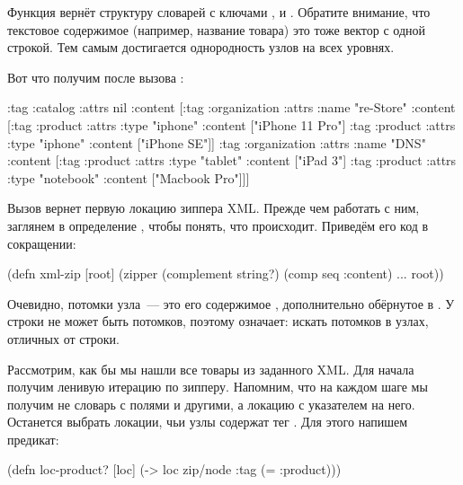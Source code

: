 Функция  вернёт структуру словарей с ключами ,
 и . Обратите внимание, что текстовое содержимое
(например, название товара) это тоже вектор с одной строкой. Тем самым
достигается однородность узлов на всех уровнях.

Вот что получим после вызова :

\begin{english}
  \begin{clojure}
{:tag :catalog
 :attrs nil
 :content
 [{:tag :organization
   :attrs {:name "re-Store"}
   :content
   [{:tag :product
     :attrs {:type "iphone"}
     :content ["iPhone 11 Pro"]}
    {:tag :product
     :attrs {:type "iphone"}
     :content ["iPhone SE"]}]}
  {:tag :organization
   :attrs {:name "DNS"}
   :content
   [{:tag :product
     :attrs {:type "tablet"}
     :content ["iPad 3"]}
    {:tag :product
     :attrs {:type "notebook"}
     :content ["Macbook Pro"]}]}]}
  \end{clojure}
\end{english}

Вызов  вернет первую локацию зиппера
XML. Прежде чем работать с ним, заглянем в определение , чтобы
понять, что происходит. Приведём его код в сокращении:

\begin{english}
  \begin{clojure}
(defn xml-zip
  [root]
  (zipper (complement string?)
          (comp seq :content)
          ...
          root))
  \end{clojure}
\end{english}

Очевидно, потомки узла~--- это его содержимое , дополнительно обёрнутое
в . У строки не может быть потомков, поэтому 
означает: искать потомков в узлах, отличных от строки.

Рассмотрим, как бы мы нашли все товары из заданного XML. Для начала получим
ленивую итерацию по зипперу. Напомним, что на каждом шаге мы получим не словарь
с полями  и другими, а локацию с указателем на него. Останется
выбрать локации, чьи узлы содержат тег . Для этого напишем
предикат:

\begin{english}
  \begin{clojure}
(defn loc-product?
  [loc]
  (-> loc zip/node :tag (= :product)))
  \end{clojure}
\end{english}

